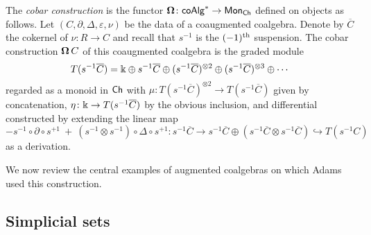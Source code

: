The \textit{cobar construction} is the functor $\operatorname{\mathbf{\Omega}} \colon \mathsf{coAlg}^* \to \mathsf{Mon}_{\mathsf{Ch}}$ defined on objects as follows.
Let $(C, \partial, \Delta, \varepsilon, \nu)$ be the data of a coaugmented coalgebra.
Denote by $\overline{C}$ the cokernel of $\nu \colon R \to C$ and recall that $s^{-1}$ is the $(-1)^\mathrm{th}$ suspension.
The cobar construction $\operatorname{\mathbf{\Omega}} C$ of this coaugmented coalgebra is the graded module
\begin{equation*}
T(s^{-1} \overline{C}) = \Bbbk \oplus s^{-1}\overline{C} \oplus (s^{-1}\overline{C})^{\otimes 2} \oplus (s^{-1}\overline{C})^{\otimes 3} \oplus \cdots
\end{equation*}
regarded as a monoid in $\mathsf{Ch}$ with $\mu \colon T(s^{-1} \overline{C})^{\otimes 2} \to T(s^{-1} \overline{C})$ given by concatenation, $\eta \colon \Bbbk \to T(s^{-1} \overline{C})$ by the obvious inclusion, and differential constructed by extending the linear map
\begin{equation*}
- s^{-1} \circ \partial \circ s^{+1} \ + \ (s^{-1} \otimes s^{-1}) \circ \Delta \circ s^{+1} \colon
s^{-1} \overline{C} \to s^{-1}\overline{C} \oplus (s^{-1}\overline{C} \otimes s^{-1}\overline{C}) \hookrightarrow T(s^{-1}C)
\end{equation*}
as a derivation.

We now review the central examples of augmented coalgebras on which Adams used this construction.

%
%


\subsection{Simplicial sets}

